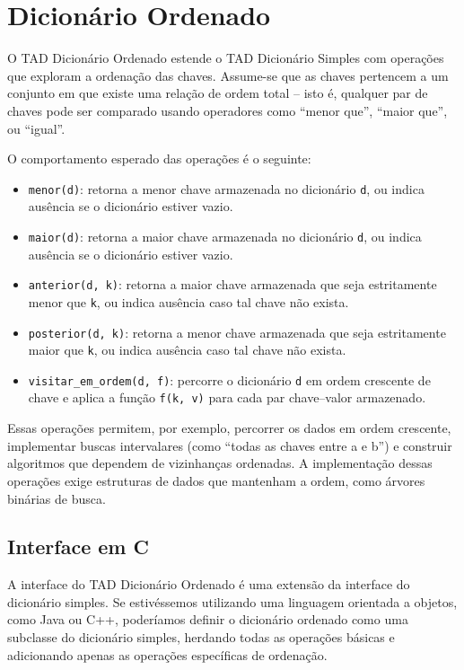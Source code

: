\section{Dicionário Ordenado}

O TAD Dicionário Ordenado estende o TAD Dicionário Simples com operações que exploram a ordenação das chaves. 
Assume-se que as chaves pertencem a um conjunto em que existe uma relação de ordem total -- isto é, qualquer par de chaves pode ser comparado usando operadores como ``menor que'', ``maior que'', ou ``igual''.

O comportamento esperado das operações é o seguinte:

\begin{itemize}
\item \verb|menor(d)|: retorna a menor chave armazenada no dicionário \texttt{d}, ou indica ausência se o dicionário estiver vazio.

\item \verb|maior(d)|: retorna a maior chave armazenada no dicionário \texttt{d}, ou indica ausência se o dicionário estiver vazio.

\item \verb|anterior(d, k)|: retorna a maior chave armazenada que seja estritamente menor que \texttt{k}, ou indica ausência caso tal chave não exista.

\item \verb|posterior(d, k)|: retorna a menor chave armazenada que seja estritamente maior que \texttt{k}, ou indica ausência caso tal chave não exista.

\item \verb|visitar_em_ordem(d, f)|: percorre o dicionário \texttt{d} em ordem crescente de chave e aplica a função \texttt{f(k, v)} para cada par chave–valor armazenado.
\end{itemize}

Essas operações permitem, por exemplo, percorrer os dados em ordem crescente, implementar buscas intervalares (como ``todas as chaves entre a e b'') e construir algoritmos que dependem de vizinhanças ordenadas. 
A implementação dessas operações exige estruturas de dados que mantenham a ordem, como árvores binárias de busca.

\subsection*{Interface em C}

A interface do TAD Dicionário Ordenado é uma extensão da interface do dicionário simples. Se estivéssemos utilizando uma linguagem orientada a objetos, como Java ou C++, poderíamos definir o dicionário ordenado como uma subclasse do dicionário simples, herdando todas as operações básicas e adicionando apenas as operações específicas de ordenação.

